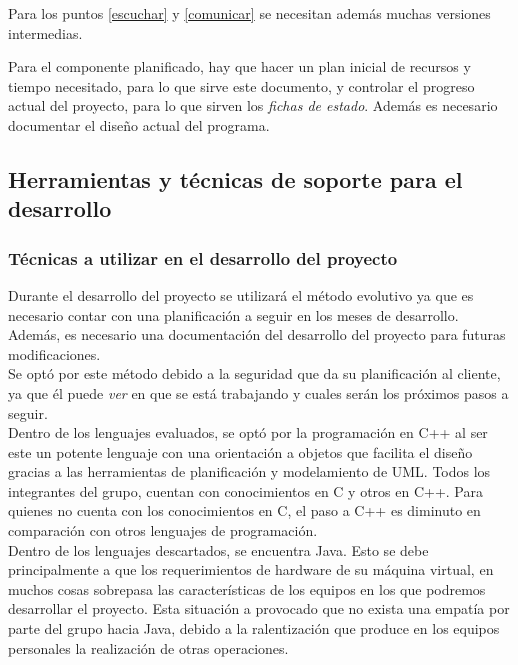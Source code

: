 \documentclass[letterpaper,spanish,10pt]{article}
\begin{document}
Para los puntos \ref{escuchar} y \ref{comunicar} se necesitan adem\'as
muchas versiones intermedias.

Para el componente planificado, hay que hacer un plan inicial de
recursos y tiempo necesitado, para lo que sirve este documento, y
controlar el progreso actual del proyecto, para lo que sirven los
\emph{fichas de estado}.
Adem\'as es necesario documentar el dise\~no actual del programa.



\subsection{Herramientas y t\'ecnicas de soporte para el desarrollo}
\subsubsection{T\'ecnicas a utilizar en el desarrollo del proyecto}

Durante el desarrollo del proyecto se utilizar\'a el m\'etodo evolutivo ya que es necesario contar con una planificaci\'on a seguir en los meses de desarrollo. Adem\'as, es necesario una documentaci\'on del desarrollo del proyecto para futuras modificaciones.\\

Se opt\'o por este m\'etodo debido a la seguridad que da su planificaci\'on al cliente, ya que \'el puede \textit{ver} en que se est\'a trabajando y cuales ser\'an los pr\'oximos pasos a seguir.\\

Dentro de los lenguajes evaluados, se opt\'o por la programaci\'on en C++ al ser este un potente lenguaje con una orientaci\'on a objetos que facilita el dise\~no gracias a las herramientas de planificaci\'on y modelamiento de UML. Todos los integrantes del grupo, cuentan con conocimientos en C y otros en C++. Para quienes no cuenta con los conocimientos en C, el paso a C++ es diminuto en comparaci\'on con otros lenguajes de programaci\'on.\\

Dentro de los lenguajes descartados, se encuentra Java. Esto se debe principalmente a que los requerimientos de hardware de su m\'aquina virtual, en muchos cosas sobrepasa las caracter\'isticas de los equipos en los que podremos desarrollar el proyecto. Esta situaci\'on a provocado que no exista una empat\'ia por parte del grupo hacia Java, debido a la ralentizaci\'on que produce en los equipos personales la realizaci\'on de otras operaciones.\\
\end{document}
